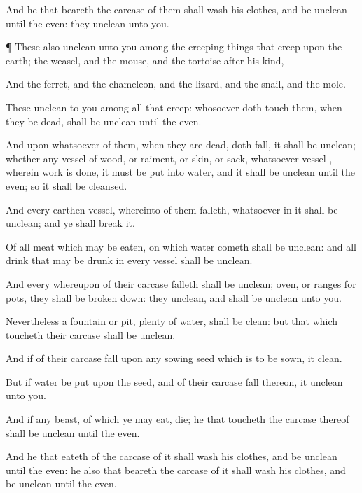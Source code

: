 {And he that
beareth the
carcase of them shall
wash his
clothes, and be
unclean until the
even: they
{}
unclean unto you.


\par }{\PP {}¶ These also
{}
unclean unto you among the creeping
things that
creep upon the
earth; the
weasel, and the
mouse, and the
tortoise after his
kind,

And the
ferret, and the
chameleon, and the
lizard, and the
snail, and the
mole.

These
{}
unclean to you among all that
creep: whosoever doth
touch them, when they be
dead, shall be
unclean until the
even.

And upon whatsoever
{} of them, when they are
dead, doth
fall, it shall be
unclean; whether
{} any
vessel of
wood, or
raiment, or
skin, or
sack, whatsoever
vessel
{}, wherein
{}
work is
done, it must be
put into
water, and it shall be
unclean until the
even; so it shall be
cleansed.

And every
earthen
vessel, whereinto
{} of them
falleth, whatsoever
{} in it shall be
unclean; and ye shall
break it.

Of all
meat which may be
eaten,
{} on which
{}
water
cometh shall be
unclean: and all
drink that may be
drunk in every
{}
vessel shall be
unclean.

And every
{} whereupon
{} of their
carcase
falleth shall be
unclean;
{}
oven, or
ranges for pots, they shall be broken
down:
{} they
{}
unclean, and shall be
unclean unto you.

Nevertheless a
fountain or
pit,
{}
plenty of
water, shall be
clean: but that which
toucheth their
carcase shall be
unclean.

And if
{} of their
carcase
fall upon any
sowing
seed which is to be
sown, it
{}
clean.

But if
{}
water be
put upon the
seed, and
{} of their
carcase
fall thereon, it
{}
unclean unto you.

And if any
beast, of which ye may
eat,
die; he that
toucheth the
carcase thereof shall be
unclean until the
even.

And he that
eateth of the
carcase of it shall
wash his
clothes, and be
unclean until the
even: he also that
beareth the
carcase of it shall
wash his
clothes, and be
unclean until the
even.

}
